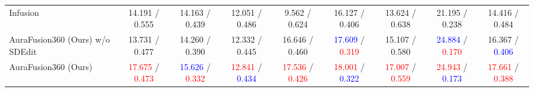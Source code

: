 \begin{table*}[t]
{\begin{tabular}{l|ccccccc|c}
Infusion~\cite{liu2024infusion} & 14.191 / 0.555 & 14.163 / 0.439 & 12.051 / 0.486 & 9.562 / 0.624 & 16.127 / 0.406 & 13.624 / 0.638 & 21.195 / 0.238 & 14.416 / 0.484 \\
AuraFusion360 (Ours) w/o SDEdit & 13.731 / 0.477 & 14.260 / 0.390 & 12.332 / 0.445 & 16.646 / 0.460 & \textcolor{blue}{17.609} / \textcolor{red}{0.319} & 15.107 / 0.580 & \textcolor{blue}{24.884} / \textcolor{red}{0.170} & 16.367 / \textcolor{blue}{0.406} \\
AuraFusion360 (Ours) & \textcolor{red}{17.675} / \textcolor{red}{0.473} & \textcolor{blue}{15.626} / \textcolor{red}{0.332} & \textcolor{red}{12.841} / \textcolor{blue}{0.434} & \textcolor{red}{17.536} / \textcolor{red}{0.426} & \textcolor{red}{18.001} / \textcolor{blue}{0.322} & \textcolor{red}{17.007} / \textcolor{red}{0.559} & \textcolor{red}{24.943} / \textcolor{blue}{0.173} & \textcolor{red}{17.661} / \textcolor{red}{0.388} \\



\bottomrule
\end{tabular}%
}
\end{table*}





